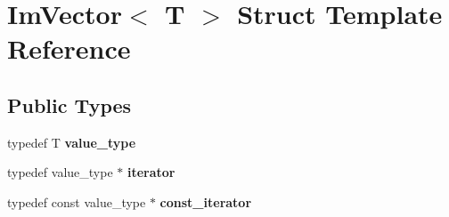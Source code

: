 \hypertarget{structImVector}{}\section{Im\+Vector$<$ T $>$ Struct Template Reference}
\label{structImVector}
\subsection*{Public Types}
\begin{DoxyCompactItemize}
\item 
\mbox{\label{structImVector_a8bd77e4e7581d8e5f9e98d7c2f3c2a80}} 
typedef T {\bfseries value\+\_\+type}
\item 
\mbox{\label{structImVector_a74b5478f1f6fd471cc71219bce483db6}} 
typedef value\+\_\+type $\ast$ {\bfseries iterator}
\item 
\mbox{\label{structImVector_aedeac9c5080f9d6ce96ae837768ee4c4}} 
typedef const value\+\_\+type $\ast$ {\bfseries const\+\_\+iterator}
\end{DoxyCompactItemize}
